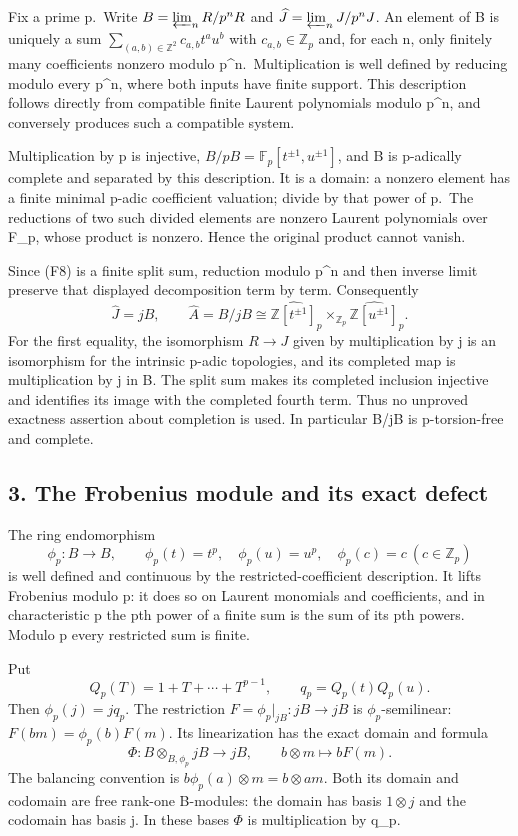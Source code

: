 \documentclass[
]{article}
\begin{document}
Fix a prime p.~Write \(B=\varprojlim_nR/p^nR\) and
\(\widehat J=\varprojlim_nJ/p^nJ\). An element of B is uniquely a sum
\(\sum_{(a,b)\in\mathbb Z^2}c_{a,b}t^a u^b\) with
\(c_{a,b}\in\mathbb Z_p\) and, for each n, only finitely many
coefficients nonzero modulo p\^{}n.~Multiplication is well defined by
reducing modulo every p\^{}n, where both inputs have finite support.
This description follows directly from compatible finite Laurent
polynomials modulo p\^{}n, and conversely produces such a compatible
system.

Multiplication by p is injective,
\(B/pB=\mathbb F_p[t^{\pm1},u^{\pm1}]\), and B is p-adically complete
and separated by this description. It is a domain: a nonzero element has
a finite minimal p-adic coefficient valuation; divide by that power of
p.~The reductions of two such divided elements are nonzero Laurent
polynomials over F\_p, whose product is nonzero. Hence the original
product cannot vanish.

Since (F8) is a finite split sum, reduction modulo p\^{}n and then
inverse limit preserve that displayed decomposition term by term.
Consequently \[
\widehat J=jB,\qquad
\widehat A=B/jB
\cong\widehat{\mathbb Z[t^{\pm1}]}_p
\times_{\mathbb Z_p}\widehat{\mathbb Z[u^{\pm1}]}_p.
\tag{F10}
\] For the first equality, the isomorphism \(R\to J\) given by
multiplication by j is an isomorphism for the intrinsic p-adic
topologies, and its completed map is multiplication by j in B. The split
sum makes its completed inclusion injective and identifies its image
with the completed fourth term. Thus no unproved exactness assertion
about completion is used. In particular B/jB is p-torsion-free and
complete.

\subsection{3. The Frobenius module and its exact
defect}\label{the-frobenius-module-and-its-exact-defect}

The ring endomorphism \[
\phi_p:B\longrightarrow B,\qquad
\phi_p(t)=t^p,\quad\phi_p(u)=u^p,\quad\phi_p(c)=c\ (c\in\mathbb Z_p)
\tag{F11}
\] is well defined and continuous by the restricted-coefficient
description. It lifts Frobenius modulo p: it does so on Laurent
monomials and coefficients, and in characteristic p the pth power of a
finite sum is the sum of its pth powers. Modulo p every restricted sum
is finite.

Put \[
Q_p(T)=1+T+\cdots+T^{p-1},\qquad q_p=Q_p(t)Q_p(u).
\tag{F12}
\] Then \(\phi_p(j)=jq_p\). The restriction \(F=\phi_p|_{jB}:jB\to jB\)
is \(\phi_p\)-semilinear: \(F(bm)=\phi_p(b)F(m)\). Its linearization has
the exact domain and formula \[
\Phi:B\otimes_{B,\phi_p}jB\longrightarrow jB,
\qquad b\otimes m\longmapsto bF(m).
\tag{F13}
\] The balancing convention is \(b\phi_p(a)\otimes m=b\otimes am\). Both
its domain and codomain are free rank-one B-modules: the domain has
basis \(1\otimes j\) and the codomain has basis j. In these bases
\(\Phi\) is multiplication by q\_p.
\end{document}
